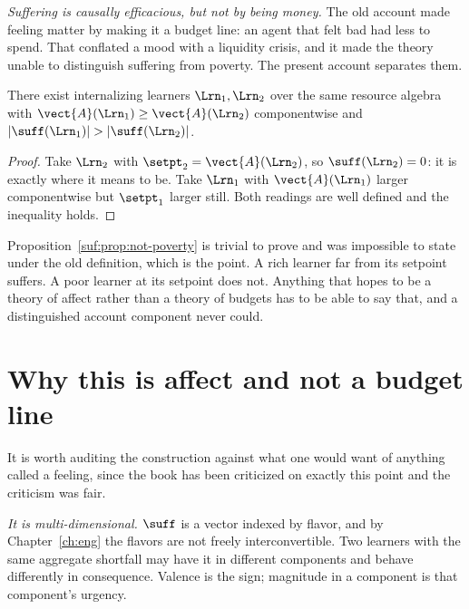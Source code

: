 \emph{Suffering is causally efficacious, but not by being money.}
The old account made feeling matter by making it a budget line: an agent
that felt bad had less to spend.
That conflated a mood with a liquidity crisis, and it made the theory
unable to distinguish suffering from poverty.
The present account separates them.

\begin{proposition}
\label{suf:prop:not-poverty}
There exist internalizing learners $\Lrn_1, \Lrn_2$ over the same
resource algebra with $\vect{A}(\Lrn_1) \geq \vect{A}(\Lrn_2)$
componentwise and $|\suff(\Lrn_1)| > |\suff(\Lrn_2)|$.
\end{proposition}

\begin{proof}
Take $\Lrn_2$ with $\setpt_2 = \vect{A}(\Lrn_2)$, so
$\suff(\Lrn_2) = 0$: it is exactly where it means to be.
Take $\Lrn_1$ with $\vect{A}(\Lrn_1)$ larger componentwise but
$\setpt_1$ larger still.
Both readings are well defined and the inequality holds.
\end{proof}

\begin{remark}
\label{suf:rem:why-independence}
Proposition~\ref{suf:prop:not-poverty} is trivial to prove and was
impossible to state under the old definition, which is the point.
A rich learner far from its setpoint suffers.
A poor learner at its setpoint does not.
Anything that hopes to be a theory of affect rather than a theory of
budgets has to be able to say that, and a distinguished account component
never could.
\end{remark}

\section{Why this is affect and not a budget line}
\label{suf:S4}

It is worth auditing the construction against what one would want of
anything called a feeling, since the book has been criticized on exactly
this point and the criticism was fair.

\emph{It is multi-dimensional.}
$\suff$ is a vector indexed by flavor, and by Chapter~\ref{ch:eng} the
flavors are not freely interconvertible.
Two learners with the same aggregate shortfall may have it in different
components and behave differently in consequence.
Valence is the sign; magnitude in a component is that component's
urgency.

